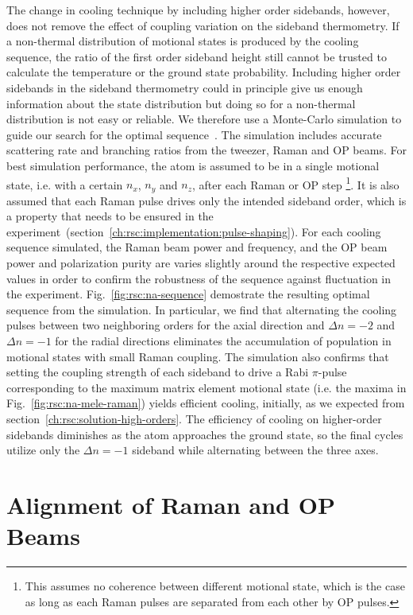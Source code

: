 The change in cooling technique by including higher order sidebands, however,
does not remove the effect of coupling variation on the sideband thermometry.
If a non-thermal distribution of motional states is produced by the cooling sequence,
the ratio of the first order sideband height still cannot be trusted to calculate
the temperature or the ground state probability.
Including higher order sidebands in the sideband thermometry could in principle
give us enough information about the state distribution but doing
so for a non-thermal distribution is not easy or reliable.
We therefore use a Monte-Carlo simulation to guide our search
for the optimal sequence~\cite{dalibard_wave-function_1992}.
The simulation includes accurate scattering rate and branching ratios
from the tweezer, Raman and OP beams.
For best simulation performance, the atom is assumed to be in a single motional state,
i.e. with a certain $n_x$, $n_y$ and $n_z$, after each Raman or OP step
\footnote{This assumes no coherence between different motional state,
  which is the case as long as each Raman pulses are separated from each other by OP pulses.}.
It is also assumed that each Raman pulse drives only the intended sideband order,
which is a property that needs to be ensured
in the experiment~(section~\ref{ch:rsc:implementation:pulse-shaping}).
For each cooling sequence simulated,
the Raman beam power and frequency, and the OP beam power and polarization purity
are varies slightly around the respective expected values
in order to confirm the robustness of the sequence against fluctuation in the experiment.
Fig.~\ref{fig:rsc:na-sequence} demostrate the resulting optimal sequence from the simulation.
In particular, we find that alternating the cooling pulses between two
neighboring orders for the axial direction and $\Delta n=-2$ and $\Delta n=-1$
for the radial directions
eliminates the accumulation of population in motional states with small Raman coupling.
The simulation also confirms that setting the coupling strength of each sideband
to drive a Rabi $\pi$-pulse corresponding to the maximum matrix element motional state
(i.e. the maxima in Fig.~\ref{fig:rsc:na-mele-raman}) yields efficient cooling, initially,
as we expected from section~\ref{ch:rsc:solution-high-orders}.
The efficiency of cooling on higher-order sidebands diminishes
as the atom approaches the ground state, so the final cycles utilize only
the $\Delta n=-1$ sideband while alternating between the three axes.

\section{Alignment of Raman and OP Beams}
\label{ch:rsc:alignment}

